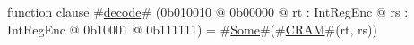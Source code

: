 function clause #\hyperref[sailMIPSzdecode]{decode}# (0b010010 @ 0b00000 @ rt : IntRegEnc @ rs : IntRegEnc @   0b10001 @ 0b111111) = #\hyperref[sailMIPSzSome]{Some}#(#\hyperref[sailMIPSzCRAM]{CRAM}#(rt, rs))
